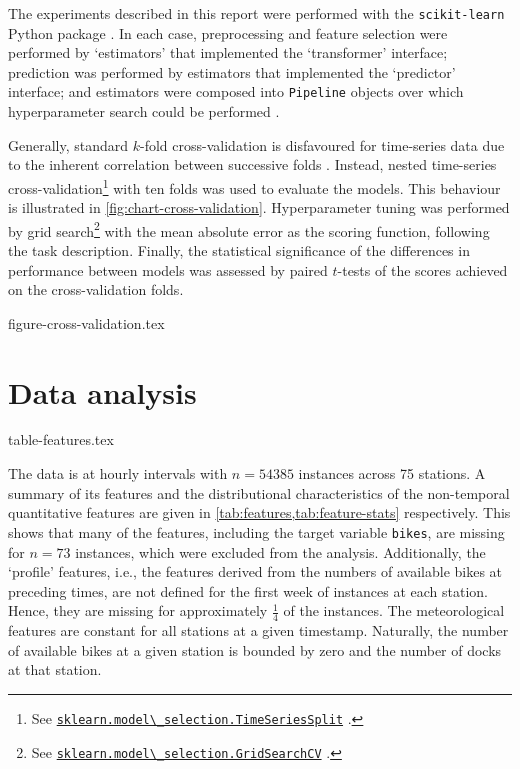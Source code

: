 \documentclass[11pt]{extarticle}
\newcommand{\sklearn}[1]{
  \href{https://scikit-learn.org/stable/modules/generated/sklearn.#1.html}{\lstinline|sklearn.#1|}
}
\begin{document}
The experiments described in this report were performed with the \texttt{scikit-learn}
Python package \parencite{Pedregosa2011}.
In each case, preprocessing and feature selection were performed by `estimators' that
implemented the `transformer' interface; prediction was performed by estimators that
implemented the `predictor' interface; and estimators were composed into
\texttt{Pipeline} objects over which hyperparameter search could be performed
\parencite[4-9]{Buitinck2013}.

Generally, standard $k$-fold cross-validation is disfavoured for time-series data due
to the inherent correlation between successive folds \parencite{Bergmeir2018}.
Instead, nested time-series
cross-validation\footnote{See \sklearn{model\_selection.TimeSeriesSplit}.} with ten folds
was used to evaluate the models.
This behaviour is illustrated in \cref{fig:chart-cross-validation}.
Hyperparameter tuning was performed by grid
search\footnote{See \sklearn{model\_selection.GridSearchCV}.} with the mean absolute
error as the scoring function, following the task description.
Finally, the statistical significance of the differences in performance between models
was assessed by paired $t$-tests of the scores achieved on the cross-validation
folds.

{figure-cross-validation.tex}

\section{Data analysis}
\label{sec:data-analysis}

{table-features.tex}

The data is at hourly intervals with $n = 54385$ instances across 75 stations.
A summary of its features and the distributional characteristics of the non-temporal
quantitative features are given in \cref{tab:features,tab:feature-stats} respectively.
This shows that many of the features, including the target variable
\texttt{bikes}, are missing for $n = 73$ instances, which were excluded from the analysis.
Additionally, the `profile' features, i.e., the features derived from the numbers of
available bikes at preceding times, are not defined for the first week of instances at
each station.
Hence, they are missing for approximately $\frac{1}{4}$ of the instances.
The meteorological features are constant for all stations at a given timestamp.
Naturally, the number of available bikes at a given station is bounded by zero and the
number of docks at that station.
\end{document}
